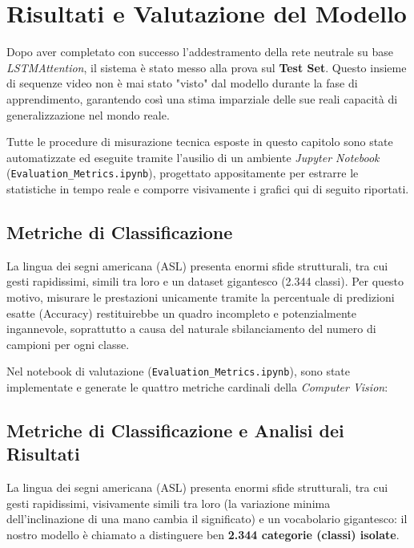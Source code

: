 
\section{Risultati e Valutazione del Modello}

Dopo aver completato con successo l'addestramento della rete neutrale su base \textit{LSTMAttention}, il sistema è stato messo alla prova sul \textbf{Test Set}. Questo insieme di sequenze video non è mai stato "visto" dal modello durante la fase di apprendimento, garantendo così una stima imparziale delle sue reali capacità di generalizzazione nel mondo reale.

Tutte le procedure di misurazione tecnica esposte in questo capitolo sono state automatizzate ed eseguite tramite l'ausilio di un ambiente \textit{Jupyter Notebook} (\texttt{Evaluation\_Metrics.ipynb}), progettato appositamente per estrarre le statistiche in tempo reale e comporre visivamente i grafici qui di seguito riportati.

\subsection{Metriche di Classificazione}
La lingua dei segni americana (ASL) presenta enormi sfide strutturali, tra cui gesti rapidissimi, simili tra loro e un dataset gigantesco (2.344 classi). 
Per questo motivo, misurare le prestazioni unicamente tramite la percentuale di predizioni esatte (Accuracy) restituirebbe un quadro incompleto e potenzialmente ingannevole, soprattutto a causa del naturale sbilanciamento del numero di campioni per ogni classe.

Nel notebook di valutazione (\texttt{Evaluation\_Metrics.ipynb}), sono state implementate e generate le quattro metriche cardinali della \textit{Computer Vision}:

\subsection{Metriche di Classificazione e Analisi dei Risultati}
La lingua dei segni americana (ASL) presenta enormi sfide strutturali, tra cui gesti rapidissimi, visivamente simili tra loro (la variazione minima dell'inclinazione di una mano cambia il significato) e un vocabolario gigantesco: il nostro modello è chiamato a distinguere ben \textbf{2.344 categorie (classi) isolate}.

